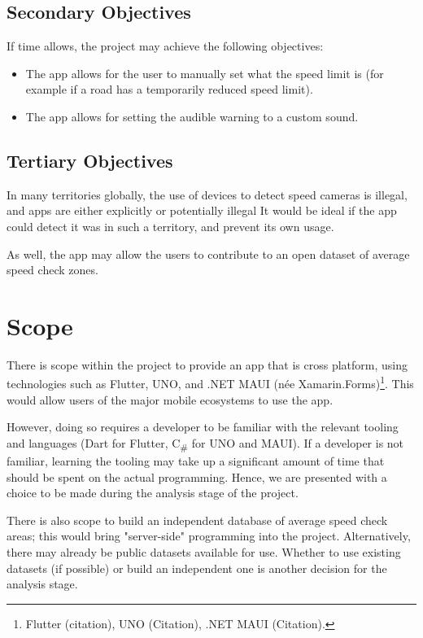 \documentclass[11pt, a4paper, notitlepage]{report}
\begin{document}
\subsection{Secondary Objectives}
If time allows, the project may achieve the following objectives:
\begin{itemize}
    \item The app allows for the user to manually set what the speed limit is 
    (for example if a road has a temporarily reduced speed limit).
    \item The app allows for setting the audible warning to a custom sound.
\end{itemize}

\subsection{Tertiary Objectives}
In many territories globally, the use of devices to detect speed cameras is 
illegal, and apps are either explicitly or potentially illegal %
It would be ideal if the app could detect it was in such a territory, and 
prevent its own usage.

As well, the app may allow the users to contribute to an open dataset of 
average speed check zones.

\section{Scope}\label{sec:Scope}
There is scope within the project to provide an app that is cross platform, 
using technologies such as Flutter, UNO, and .NET MAUI (née 
Xamarin.Forms)\footnote{Flutter (citation), UNO (Citation), .NET MAUI 
(Citation).}. This would allow users of the major mobile ecosystems to use the 
app. 

However, doing so requires a developer to be familiar with the relevant tooling 
and languages (Dart for Flutter, C\textsubscript{\#} for UNO and MAUI). If a 
developer is not familiar, learning the tooling may take up a significant 
amount of time that should be spent on the actual programming. Hence, we are 
presented with a choice to be made during the analysis stage of the project.

There is also scope to build an independent database of average speed check 
areas; this would bring "server-side" programming into the project. 
Alternatively, there may already be public datasets available for use. Whether 
to use existing datasets (if possible) or build an independent one is another 
decision for the analysis stage. 
\end{document}
